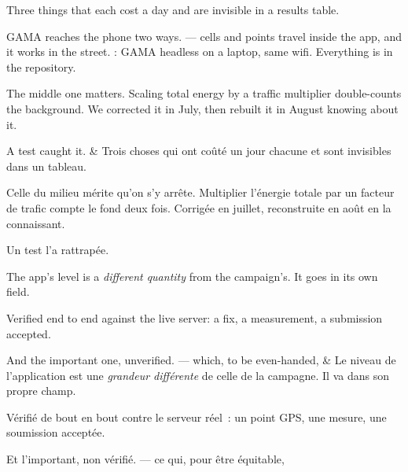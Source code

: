 \documentclass[10pt,a4paper]{article}
\begin{document}
\begin{say}
Three things that each cost a day and are invisible in a results table.

GAMA reaches the phone two ways.  --- cells and points
travel inside the app, and it works in the street. : GAMA headless on a laptop, same wifi. Everything is in the repository.

The middle one matters. 
Scaling total energy by a traffic multiplier double-counts the background. We
corrected it in July, then rebuilt it in August knowing about it.

 A test caught it.
&
Trois choses qui ont coûté un jour chacune et sont invisibles dans un tableau.

Celle du milieu mérite qu'on s'y arrête.  Multiplier l'énergie totale par un facteur de trafic compte le fond deux
fois. Corrigée en juillet, reconstruite en août en la connaissant.

 Un test l'a rattrapée.
\end{say}

\begin{say}
The app's level is a \emph{different quantity} from the campaign's. It goes in
its own field. 

Verified end to end against the live server: a fix, a measurement, a submission
accepted.

And the important one, unverified.  --- which, to be even-handed, 
&
Le niveau de l'application est une \emph{grandeur différente} de celle de la
campagne. Il va dans son propre champ. 

Vérifié de bout en bout contre le serveur réel~: un point GPS, une mesure, une
soumission acceptée.

Et l'important, non vérifié.  --- ce qui, pour être équitable, 
\end{say}
\end{document}
